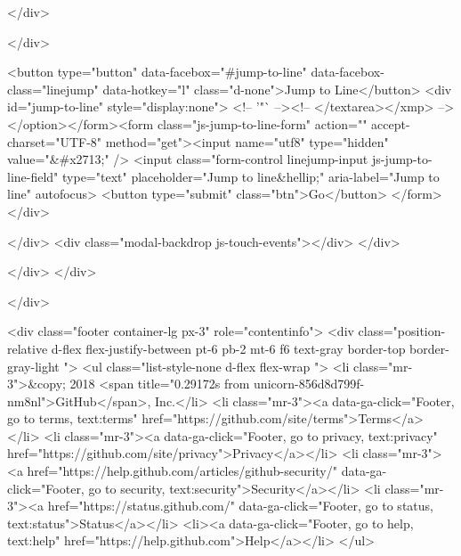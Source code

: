   </div>

  </div>

  <button type="button" data-facebox="#jump-to-line" data-facebox-class="linejump" data-hotkey="l" class="d-none">Jump to Line</button>
  <div id="jump-to-line" style="display:none">
    <!-- '"` --><!-- </textarea></xmp> --></option></form><form class="js-jump-to-line-form" action="" accept-charset="UTF-8" method="get"><input name="utf8" type="hidden" value="&#x2713;" />
      <input class="form-control linejump-input js-jump-to-line-field" type="text" placeholder="Jump to line&hellip;" aria-label="Jump to line" autofocus>
      <button type="submit" class="btn">Go</button>
</form>  </div>


  </div>
  <div class="modal-backdrop js-touch-events"></div>
</div>

    </div>
  </div>

  </div>

      
<div class="footer container-lg px-3" role="contentinfo">
  <div class="position-relative d-flex flex-justify-between pt-6 pb-2 mt-6 f6 text-gray border-top border-gray-light ">
    <ul class="list-style-none d-flex flex-wrap ">
      <li class="mr-3">&copy; 2018 <span title="0.29172s from unicorn-856d8d799f-nm8nl">GitHub</span>, Inc.</li>
        <li class="mr-3"><a data-ga-click="Footer, go to terms, text:terms" href="https://github.com/site/terms">Terms</a></li>
        <li class="mr-3"><a data-ga-click="Footer, go to privacy, text:privacy" href="https://github.com/site/privacy">Privacy</a></li>
        <li class="mr-3"><a href="https://help.github.com/articles/github-security/" data-ga-click="Footer, go to security, text:security">Security</a></li>
        <li class="mr-3"><a href="https://status.github.com/" data-ga-click="Footer, go to status, text:status">Status</a></li>
        <li><a data-ga-click="Footer, go to help, text:help" href="https://help.github.com">Help</a></li>
    </ul>

